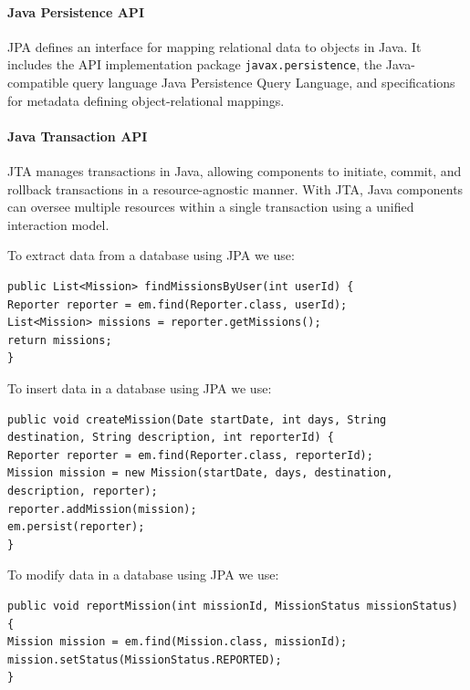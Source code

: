 \paragraph*{Java Persistence API}
JPA defines an interface for mapping relational data to objects in Java. 
It includes the API implementation package \texttt{javax.persistence}, the Java-compatible query language Java Persistence Query Language, and specifications for metadata defining object-relational mappings.
    
\paragraph*{Java Transaction API}
JTA manages transactions in Java, allowing components to initiate, commit, and rollback transactions in a resource-agnostic manner. 
With JTA, Java components can oversee multiple resources within a single transaction using a unified interaction model.

\begin{example}
    To extract data from a database using JPA we use: 
    \begin{lstlisting}[style=Java]
public List<Mission> findMissionsByUser(int userId) {
Reporter reporter = em.find(Reporter.class, userId);
List<Mission> missions = reporter.getMissions();
return missions;
}
    \end{lstlisting}
    To insert data in a database using JPA we use: 
    \begin{lstlisting}[style=Java]
public void createMission(Date startDate, int days, String destination, String description, int reporterId) {
Reporter reporter = em.find(Reporter.class, reporterId);
Mission mission = new Mission(startDate, days, destination, description, reporter);
reporter.addMission(mission);
em.persist(reporter);
}        
    \end{lstlisting}
    To modify data in a database using JPA we use: 
    \begin{lstlisting}[style=Java]
public void reportMission(int missionId, MissionStatus missionStatus) {
Mission mission = em.find(Mission.class, missionId);
mission.setStatus(MissionStatus.REPORTED);
}
    \end{lstlisting}
\end{example}